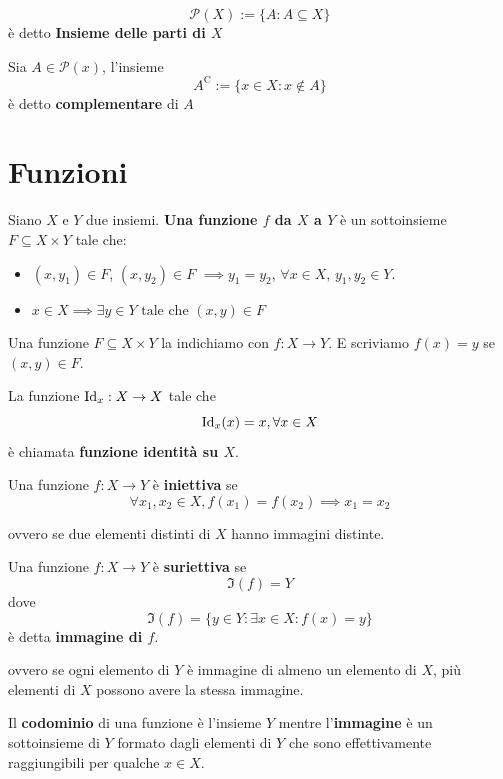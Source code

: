 \documentclass[../main.tex]{subfiles}
\begin{document}
\begin{definition}
    \[
        \mathcal{P} (X) := \{ A : A \subseteq X \}
    \]
    è detto \textbf{Insieme delle parti di $X$}
\end{definition}

\begin{definition}[Complementare]
    Sia $A \in \mathcal{P} (x)$, l'insieme
    \[
        A^\mathrm{C} := \{ x \in X : x \notin A \}
    \]
    è detto \textbf{complementare} di $A$
\end{definition}

\section{Funzioni}
\begin{definition}[Funzione]
    Siano $X$ e $Y$ due insiemi. \textbf{Una funzione $f$ da $X$ a $Y$} è un sottoinsieme $F \subseteq X \times Y$ tale che:
    \begin{itemize}
        \item $(x, y_1) \in F$, $(x,y_2) \in F$ $\implies y_1 = y_2$, $\forall x \in X$, $y_1,y_2 \in Y$.
        \item $x \in X \implies \exists y \in Y \text{ tale che } (x,y) \in F$
    \end{itemize}
    Una funzione $F \subseteq X \times Y$ la indichiamo con $f : X \to Y$. E scriviamo $f(x) = y$ se $(x,y) \in F$.
\end{definition}

\begin{definition}
    La funzione $\operatorname{Id}_x : X \rightarrow X $ tale che
    \[
        \operatorname{Id}_x (x) = x, \forall x \in X
    \]
    è chiamata \textbf{funzione identità su $X$}.
\end{definition}

\begin{definition}
    Una funzione $f: X \rightarrow Y$ è \textbf{iniettiva} se
    \[
        \forall x_1, x_2 \in X, f(x_1) = f(x_2) \implies x_1 = x_2
    \]

    ovvero se due elementi distinti di $X$ hanno immagini distinte.
\end{definition}

\begin{definition}
    Una funzione $f: X \rightarrow Y$ è \textbf{suriettiva} se
    \[
        \Im(f) = Y
    \]
    dove
    \[
        \boxed{
            \Im(f) = \{ y \in Y : \exists x \in X : f(x) = y \}
        }
    \]
    è detta \textbf{immagine di $f$}.

    ovvero se ogni elemento di $Y$ è immagine di almeno un elemento di $X$, più elementi di $X$ possono avere la stessa immagine.
\end{definition}
\begin{note}
    Il \textbf{codominio} di una funzione è l'insieme $Y$ mentre l'\textbf{immagine} è un sottoinsieme di $Y$ formato dagli elementi di $Y$ che sono effettivamente raggiungibili per qualche $x \in X$.
\end{note}
\end{document}
